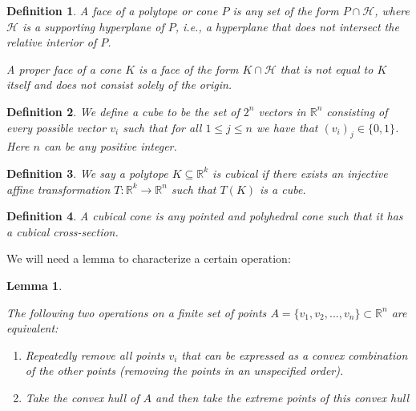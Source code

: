 \documentclass{article}
\newtheorem{lem}{Lemma}
\newtheorem{define}{Definition}
\begin{document}
\begin{define}
    A \textit{face} of a polytope or cone \( P \) is any set of the form \( P \cap \mathcal{H} \), where \( \mathcal{H} \) is a supporting hyperplane of \( P \), i.e., a hyperplane that does not intersect the relative interior of \( P \).

    A \textit{proper face} of a cone \( K \) is a face of the form \( K \cap \mathcal{H} \) that is not equal to \( K \) itself and does not consist solely of the origin.
\end{define}



\begin{define}
    We define a \textit{cube} to be the set of $2^n$ vectors in $\mathbb{R}^n$ consisting of every possible vector $v_i$ such that for all $1 \leq j \leq n$ we have that $(v_i)_j \in \{0,1\}$. Here $n$ can be any positive integer.
\end{define}

\begin{define}
    We say a polytope $K \subseteq \mathbb{R}^k$ is \textit{cubical} if there exists an injective affine transformation $T: \mathbb{R}^k \rightarrow \mathbb{R}^n$ such that $T(K)$ is a cube.
\end{define}

\begin{define}
    A \textit{cubical cone} is any pointed and polyhedral cone such that it has a cubical cross-section.
\end{define}

We will need a lemma to characterize a certain operation:

\begin{lem}
\label{lem:extrem points characterize}

The following two operations on a finite set of points $ A =\{v_1,v_2,..., v_n\} \subset \mathbb{R}^n$ are equivalent:

\begin{enumerate}
    \item Repeatedly remove all points $v_i$ that can be expressed as a convex combination of the other points (removing the points in an unspecified order).
    \item Take the convex hull of $A$ and then take the extreme points of this convex hull
\end{enumerate}
    
\end{lem}
\end{document}
